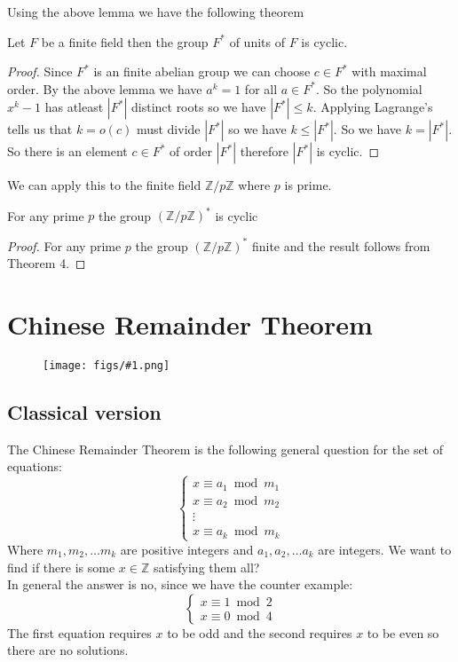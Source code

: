 \documentclass[16pt,a4paper]{article}
\theoremstyle{definition}
\newcommand{\Z}{\mathbb{Z}}
\newcommand{\fig}[2]{\begin{figure}[hbtp] 
 \centering
 \texttt{[image: figs/\#1.png]}
 \end{figure}
}
\begin{document}
Using the above lemma we have the following theorem

\begin{thm}{}{}
Let $F$ be a finite field then the group $F^\ast$ of units of $F$ is cyclic. 
\end{thm}
\begin{proof}
Since $F^\ast$ is an finite abelian group we can choose $c\in F^*$ with maximal order. By the above lemma we have $a^k = 1$ for all $a\in F^*$. So the polynomial $x^k - 1$ has atleast $|F^*|$ distinct roots so we have $|F^*|\leq k$. Applying Lagrange's tells us that $k=o(c)$ must divide $|F^*|$ so we have $k\leq |F^*|$. So we have $k=|F^*|$. So there is an element $c\in F^*$ of order $|F^*|$ therefore $|F^*|$ is cyclic. 
\end{proof}

We can apply this to the finite field $\Z/p\Z$ where $p$ is prime. 

\begin{coll}{}{}
For any prime $p$ the group $(\Z/p\Z)^*$ is cyclic
\end{coll}
\begin{proof}
For any prime $p$ the group $(\Z/p\Z)^*$ finite and the result follows from Theorem 4. 
\end{proof}
\newpage
\section{Chinese Remainder Theorem}
\fig{fig4}{0.07}
\subsection{Classical version}
The Chinese Remainder Theorem is the following general question for the set of equations: 
\[
\begin{cases}
x\equiv a_1 \bmod m_1 \\
x\equiv a_2 \bmod m_2 \\
\vdots  \\
x\equiv a_k \bmod m_k
\end{cases}
\]
Where $m_1,m_2,\ldots m_k$ are positive integers and $a_1,a_2,\ldots a_k$ are integers. We want to find if there is some $x\in \Z$ satisfying them all? 
\\
In general the answer is no, since we have the counter example: 
\[
\begin{cases}
x\equiv 1 \bmod 2 \\
x\equiv 0 \bmod 4 
\end{cases}
\]
The first equation requires $x$ to be odd and the second requires $x$ to be even so there are no solutions. 
\\
\end{document}
